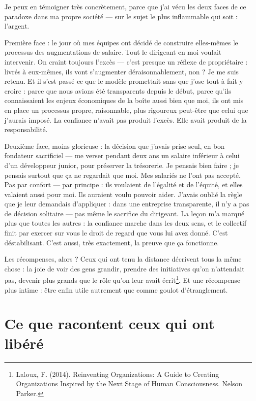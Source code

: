 Je peux en témoigner très concrètement, parce que j'ai vécu les deux faces de ce paradoxe dans ma propre société — sur le sujet le plus inflammable qui soit : l'argent.

Première face : le jour où mes équipes ont décidé de construire elles-mêmes le processus des augmentations de salaire. Tout le dirigeant en moi voulait intervenir. On craint toujours l'excès — c'est presque un réflexe de propriétaire : livrés à eux-mêmes, ils vont s'augmenter déraisonnablement, non ? Je me suis retenu. Et il s'est passé ce que le modèle promettait sans que j'ose tout à fait y croire : parce que nous avions été transparents depuis le début, parce qu'ils connaissaient les enjeux économiques de la boîte aussi bien que moi, ils ont mis en place un processus propre, raisonnable, plus rigoureux peut-être que celui que j'aurais imposé. La confiance n'avait pas produit l'excès. Elle avait produit de la responsabilité.

Deuxième face, moins glorieuse : la décision que j'avais prise seul, en bon fondateur sacrificiel — me verser pendant deux ans un salaire inférieur à celui d'un développeur junior, pour préserver la trésorerie. Je pensais bien faire ; je pensais surtout que ça ne regardait que moi. Mes salariés ne l'ont pas accepté. Pas par confort — par principe : ils voulaient de l'égalité et de l'équité, et elles valaient aussi pour moi. Ils auraient voulu pouvoir aider. J'avais oublié la règle que je leur demandais d'appliquer : dans une entreprise transparente, il n'y a pas de décision solitaire — pas même le sacrifice du dirigeant. La leçon m'a marqué plus que toutes les autres : la confiance marche dans les deux sens, et le collectif finit par exercer sur vous le droit de regard que vous lui avez donné. C'est déstabilisant. C'est aussi, très exactement, la preuve que ça fonctionne.

Les récompenses, alors ? Ceux qui ont tenu la distance décrivent tous la même chose : la joie de voir des gens grandir, prendre des initiatives qu'on n'attendait pas, devenir plus grands que le rôle qu'on leur avait écrit\footnote{Laloux, F. (2014). Reinventing Organizations: A Guide to Creating Organizations Inspired by the Next Stage of Human Consciousness. Nelson Parker.}. Et une récompense plus intime : être enfin utile autrement que comme goulot d'étranglement.

\section{Ce que racontent ceux qui ont libéré}

